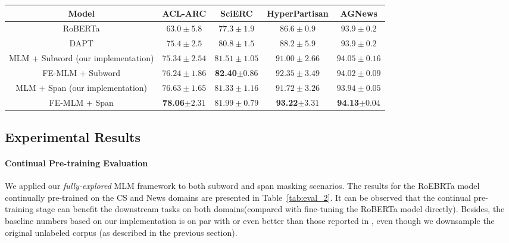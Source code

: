 \documentclass{article} \usepackage{iclr2021_conference,times}
\newcommand{\tf}[1]{\textbf{#1}}
\theoremstyle{plain}
\begin{document}
\begin{table*}[ht!]
	\centering
	\begin{small}
		\vspace{0mm}
		\setlength{\tabcolsep}{5pt}
		\def\arraystretch{1.0}
		\begin{tabular}{c||c|c|c|c}
			\toprule[1.2pt]
			\tf{Model} & \tf{ACL-ARC} & \tf{SciERC}    & \tf{HyperPartisan} & \tf{AGNews} \\
			\hline
RoBERTa \citep{gururangan2020don}  & $63.0\pm5.8$ & $77.3\pm1.9$ & $86.6\pm0.9$ & $93.9\pm0.2$ \\
			DAPT \citep{gururangan2020don}  & $75.4\pm2.5$ & $80.8\pm1.5$ & $88.2\pm5.9$ &  $93.9\pm0.2$ \\
			\hline
			MLM + Subword (our implementation) & $75.34\pm2.54$ & $81.51\pm1.05$ & $91.00\pm2.66$ & $94.05\pm0.16$ \\
			FE-MLM + Subword & $76.24\pm1.86$ & \tf{82.40}$\pm0.86$ & $92.35\pm3.49$ & $94.02\pm0.09$ \\
			\hline
			MLM + Span (our implementation) & $76.63\pm1.65$ & $81.33\pm1.16$ & $91.72\pm3.26$ &  $93.94\pm0.05$ \\
			FE-MLM + Span & \tf{78.06}$\pm2.31$ & $81.99\pm0.79$ & \tf{93.22}$\pm3.31$  &  \tf{94.13}$\pm0.04$ \\
			\bottomrule[1.2pt]
		\end{tabular}\caption{The empirical results on continual pre-training setting, where RoBERTa and DAPT (RoBERTa continually pre-trained with the standard MLM objective) is leveraged as our baseline to facilitate comparison with \citep{gururangan2020don}. Specifically, ACL-ARC and SciERC are evaluated with the continually pre-trained model with CS domain corpus, while HyperPartisann and AGNews are based upon models trained with News domain corpus.}
		\label{tab:eval_2}
	\end{small}
	\vspace{-2mm}
\end{table*}
\vspace{-1mm}
\subsection{Experimental Results}
\vspace{-2mm}
\paragraph{Continual Pre-training Evaluation}  We applied our \emph{fully-explored} MLM framework to both subword and span masking scenarios.
The results for the RoEBRTa model continually pre-trained on the CS and News domains are presented in Table~\ref{tab:eval_2}.
It can be observed that the continual pre-training stage can benefit the downstream tasks on both domains(compared with fine-tuning the RoBERTa model directly).
Besides, the baseline numbers based on our implementation is on par with or even better than those reported in \cite{gururangan2020don}, even though we downsample the original unlabeled corpus (as described in the previous section). 
\end{document}
